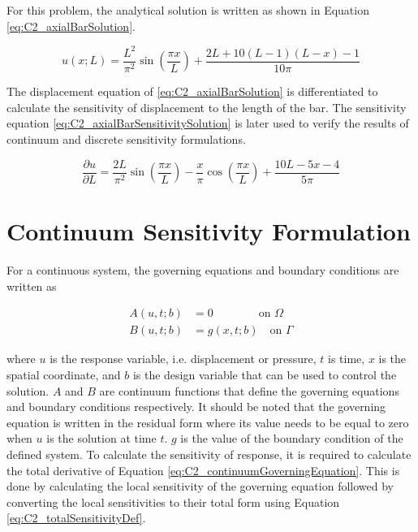 For this problem, the analytical solution is written as shown in Equation \eqref{eq:C2_axialBarSolution}.

\begin{equation}\label{eq:C2_axialBarSolution}
	u(x; L) = 
	\frac{L^2}{\pi^2} \sin \left( \frac{\pi x}{L} \right) + 
	\frac{2L + 10(L - 1)(L - x) - 1}{10 \pi}
\end{equation}

The displacement equation of \eqref{eq:C2_axialBarSolution} is differentiated to calculate the sensitivity of displacement to the length of the bar. The sensitivity equation \eqref{eq:C2_axialBarSensitivitySolution} is later used to verify the results of continuum and discrete sensitivity formulations.

\begin{equation}\label{eq:C2_axialBarSensitivitySolution}
	\dfrac{\partial u}{\partial L} = 
	\dfrac{2L}{\pi^2} \sin \left( \frac{\pi x}{L} \right) - 
	\dfrac{x}{\pi} \cos \left( \frac{\pi x}{L} \right) + 
	\dfrac{10L - 5x - 4}{5 \pi}
\end{equation}

\section{Continuum Sensitivity Formulation}
For a continuous system, the governing equations and boundary conditions are written as

\begin{subequations}\label{eq:C2_continuumGoverningEquation}
\begin{align}
	A(u, t; b) &= 0 \qquad \qquad \text{on } \Omega \\
	B(u, t; b) &= g(x, t; b) \quad \text{on } \Gamma
\end{align}	
\end{subequations}

where $u$ is the response variable, i.e. displacement or pressure, $t$ is time, $x$ is the spatial coordinate, and $b$ is the design variable that can be used to control the solution. $A$ and $B$ are continuum functions that define the governing equations and boundary conditions respectively. It should be noted that the governing equation is written in the residual form where its value needs to be equal to zero when $u$ is the solution at time $t$. $g$ is the value of the boundary condition of the defined system. To calculate the sensitivity of response, it is required to calculate the total derivative of Equation \eqref{eq:C2_continuumGoverningEquation}. This is done by calculating the local sensitivity of the governing equation followed by converting the local sensitivities to their total form using Equation \eqref{eq:C2_totalSensitivityDef}.

